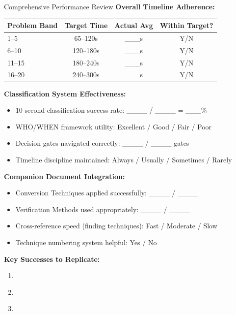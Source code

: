 \documentclass{article}
\begin{document}
\begin{analysisbox}{Comprehensive Performance Review}
\textbf{Overall Timeline Adherence:}
\begin{center}
\begin{tabular}{|l|c|c|c|}
\hline
\textbf{Problem Band} & \textbf{Target Time} & \textbf{Actual Avg} & \textbf{Within Target?} \\
\hline
1--5 & 65--120s & \_\_\_s & Y/N \\
6--10 & 120--180s & \_\_\_s & Y/N \\
11--15 & 180--240s & \_\_\_s & Y/N \\
16--20 & 240--300s & \_\_\_s & Y/N \\
\hline
\end{tabular}
\end{center}

\textbf{Classification System Effectiveness:}
\begin{itemize}[nosep]
\item 10-second classification success rate: \_\_\_\_ / \_\_\_\_ = \_\_\_\%
\item WHO/WHEN framework utility: Excellent / Good / Fair / Poor
\item Decision gates navigated correctly: \_\_\_\_ / \_\_\_\_ gates
\item Timeline discipline maintained: Always / Usually / Sometimes / Rarely
\end{itemize}

\textbf{Companion Document Integration:}
\begin{itemize}[nosep]
\item Conversion Techniques applied successfully: \_\_\_\_ / \_\_\_\_
\item Verification Methods used appropriately: \_\_\_\_ / \_\_\_\_
\item Cross-reference speed (finding techniques): Fast / Moderate / Slow
\item Technique numbering system helpful: Yes / No
\end{itemize}

\textbf{Key Successes to Replicate:}
\begin{enumerate}[nosep]
\item \underline{\hspace{8cm}}
\item \underline{\hspace{8cm}}
\item \underline{\hspace{8cm}}
\end{enumerate}


\end{analysisbox}
\end{document}
